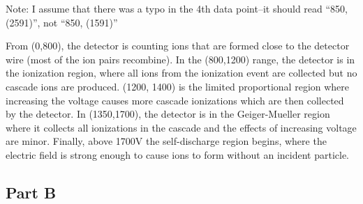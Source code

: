 \documentclass[11pt]{article}
\begin{document}
    Note: I assume that there was a typo in the 4th data point--it should
read ``850, (2591)'', not ``850, (1591)''

    From (0,800), the detector is counting ions that are formed close to the
detector wire (most of the ion pairs recombine). In the (800,1200)
range, the detector is in the ionization region, where all ions from the
ionization event are collected but no cascade ions are produced. (1200,
1400) is the limited proportional region where increasing the voltage
causes more cascade ionizations which are then collected by the
detector. In (1350,1700), the detector is in the Geiger-Mueller region
where it collects all ionizations in the cascade and the effects of
increasing voltage are minor. Finally, above 1700V the self-discharge
region begins, where the electric field is strong enough to cause ions
to form without an incident particle.

    \subsection{Part B}\label{part-b}
\end{document}
